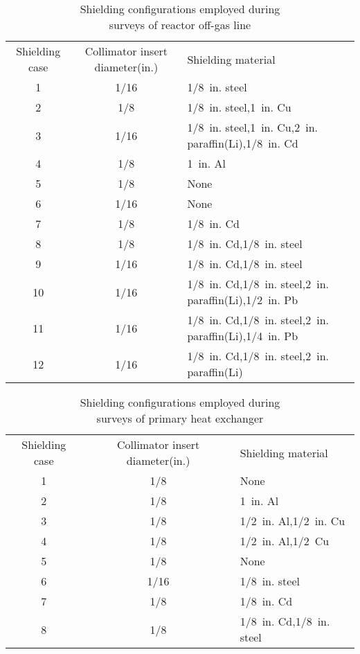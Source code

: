 \begin{table}
\centering
\label{table_5_2}
\onelinecaptionsfalse
\caption{Shielding configurations employed during \protect\\
	surveys of reactor off-gas line}
\begin{tabular}[c]{ccl}
\hline
\multirow{3}{2cm}{Shielding case} & \multirow{3}{2cm}{Collimator insert 
	diameter(in.)} &  \multirow{3}{4cm}{Shielding material}\\
		\\
		\\
\hline
1  &  1/16  & 1/8\ in. steel  \\
2  &  1/8  & 1/8\ in. steel,1\ in.  Cu  \\
3  &  1/16  & 1/8\ in. steel,1\ in.  Cu,2\ in.  paraffin(Li),1/8\ in.  Cd  \\
4  &  1/8  & 1\ in. Al  \\
5  &  1/8  & None  \\
6  &  1/16  & None  \\
7  &  1/8  & 1/8\ in. Cd  \\
8  &  1/8  & 1/8\ in. Cd,1/8\ in.  steel  \\
9  &  1/16  & 1/8\ in.  Cd,1/8\ in. steel  \\
10  &  1/16  & 1/8\ in. Cd,1/8\ in.  steel,2\ in.  paraffin(Li),1/2\ in.  Pb  \\
11  &  1/16  & 1/8\ in. Cd,1/8\ in.  steel,2\ in.  paraffin(Li),1/4\ in.  Pb  \\
12  &  1/16  & 1/8\ in. Cd,1/8\ in.  steel,2\ in.  paraffin(Li) \\
\hline
\end{tabular}
\end{table}

\begin{table}
\centering
\onelinecaptionsfalse
\caption{Shielding configurations employed during \protect \\ surveys of primary heat exchanger}
\label{table_5_3}
\begin{tabular}[c]{ccl}
\hline
\multirow{3}{2cm}{Shielding case} & \multirow{3}{2cm}{Collimator insert 
	diameter(in.)} &  \multirow{3}{4cm}{Shielding material}\\
		\\
		\\
\hline
1  &  1/8  & None  \\
2  &  1/8  & 1\ in. Al \\
3  &  1/8  & 1/2\ in. Al,1/2\ in.  Cu  \\
4  &  1/8  & 1/2\ in. Al,1/2\ Cu  \\
5  &  1/8  & None  \\
6  &  1/16  & 1/8\ in. steel  \\
7  &  1/8  & 1/8\ in. Cd  \\
8  &  1/8  & 1/8\ in. Cd,1/8\ in.  steel  
\\
\hline
\end{tabular}
\end{table}

